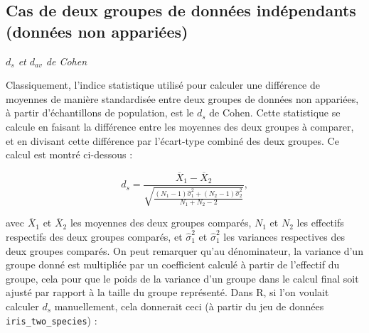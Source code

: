 \documentclass[
]{book}
\begin{document}
\hypertarget{cas-de-deux-groupes-de-donnuxe9es-induxe9pendants-donnuxe9es-non-appariuxe9es}{%
\subsection{Cas de deux groupes de données indépendants (données non appariées)}\label{cas-de-deux-groupes-de-donnuxe9es-induxe9pendants-donnuxe9es-non-appariuxe9es}}

\emph{\(d_{s}\) et \(d_{av}\) de Cohen}

Classiquement, l'indice statistique utilisé pour calculer une différence de moyennes de manière standardisée entre deux groupes de données non appariées, à partir d'échantillons de population, est le \(d_{s}\) de Cohen. Cette statistique se calcule en faisant la différence entre les moyennes des deux groupes à comparer, et en divisant cette différence par l'écart-type combiné des deux groupes. Ce calcul est montré ci-dessous :

\[d_{s} = \frac{\overline{X}_{1} - \overline{X}_{2}} {\sqrt{\frac{(N_{1} - 1) \hat{\sigma}_{1}^2 + (N_{2} - 1) \hat{\sigma}_{2}^2} {N_{1} + N_{2} - 2}}},\]

avec \(\overline{X}_{1}\) et \(\overline{X}_{2}\) les moyennes des deux groupes comparés, \(N_{1}\) et \(N_{2 }\) les effectifs respectifs des deux groupes comparés, et \(\hat{\sigma}_{1}^2\) et \(\hat{\sigma}_{1}^2\) les variances respectives des deux groupes comparés. On peut remarquer qu'au dénominateur, la variance d'un groupe donné est multipliée par un coefficient calculé à partir de l'effectif du groupe, cela pour que le poids de la variance d'un groupe dans le calcul final soit ajusté par rapport à la taille du groupe représenté. Dans R, si l'on voulait calculer \(d_s\) manuellement, cela donnerait ceci (à partir du jeu de données \texttt{iris\_two\_species}) :
\end{document}
